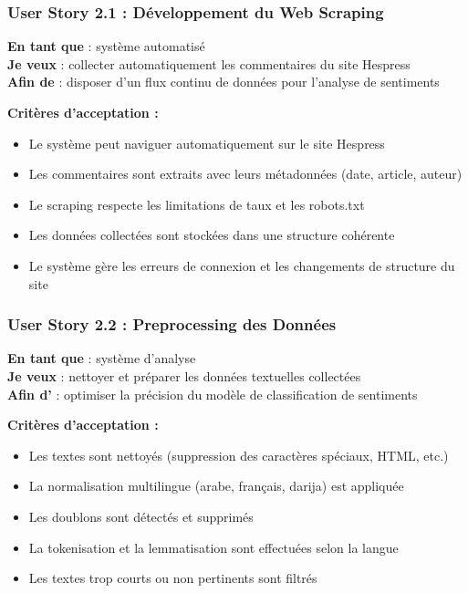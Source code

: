\subsubsection{User Story 2.1 : Développement du Web Scraping}

\textbf{En tant que} : système automatisé \\
\textbf{Je veux} : collecter automatiquement les commentaires du site Hespress \\
\textbf{Afin de} : disposer d'un flux continu de données pour l'analyse de sentiments

\textbf{Critères d'acceptation :}
\begin{itemize}
    \item Le système peut naviguer automatiquement sur le site Hespress
    \item Les commentaires sont extraits avec leurs métadonnées (date, article, auteur)
    \item Le scraping respecte les limitations de taux et les robots.txt
    \item Les données collectées sont stockées dans une structure cohérente
    \item Le système gère les erreurs de connexion et les changements de structure du site
\end{itemize}

\subsubsection{User Story 2.2 : Preprocessing des Données}

\textbf{En tant que} : système d'analyse \\
\textbf{Je veux} : nettoyer et préparer les données textuelles collectées \\
\textbf{Afin d'} : optimiser la précision du modèle de classification de sentiments

\textbf{Critères d'acceptation :}
\begin{itemize}
    \item Les textes sont nettoyés (suppression des caractères spéciaux, HTML, etc.)
    \item La normalisation multilingue (arabe, français, darija) est appliquée
    \item Les doublons sont détectés et supprimés
    \item La tokenisation et la lemmatisation sont effectuées selon la langue
    \item Les textes trop courts ou non pertinents sont filtrés
\end{itemize}

